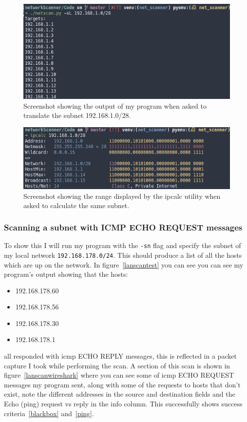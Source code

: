 \documentclass[titlepage]{article}
\let\Oldsubsubsection\subsubsection{}
\renewcommand{\subsubsection}{\FloatBarrier\Oldsubsubsection}
\begin{document}
\begin{figure}[H]
  \centering
  \includegraphics[width=\textwidth]{screenshots/iplist.png}
  \caption{%
    Screenshot showing the output of my program when asked to translate the subnet 192.168.1.0/28.
  }\label{cidrtest}
\end{figure}

\begin{figure}[H]
  \centering
  \includegraphics[width=\textwidth]{screenshots/ipcalclist.png}
  \caption{%
    Screenshot showing the range displayed by the ipcalc utility when asked to calculate
    the same subnet.
  }\label{cidrwebproof}
\end{figure}

\subsubsection{Scanning a subnet with ICMP ECHO REQUEST messages}
To show this I will run my program with the \verb|-sn| flag and specify the
subnet of my local network \verb|192.168.178.0/24|.
This should produce a list of all the hosts which are up on the network.
In figure~\ref{lanscantest} you can see you can see my program's output
showing that the hosts:
\begin{itemize}
  \item{192.168.178.60}
  \item{192.168.178.56}
  \item{192.168.178.30}
  \item{192.168.178.1}
\end{itemize}
all responded with \gls{icmp} ECHO REPLY messages, this is reflected
in a packet capture I took while performing the scan. A section of this
scan is shown in figure~\ref{lanscanwireshark} where you can see some of
\gls{icmp} ECHO REQUEST messages my program sent, along with some of the requests
to hosts that don't exist, note the different addresses in the source and destination fields
and the Echo (ping) request vs reply in the info column. This successfully shows success
criteria~\ref{blackbox} and~\ref{ping}.
\end{document}
